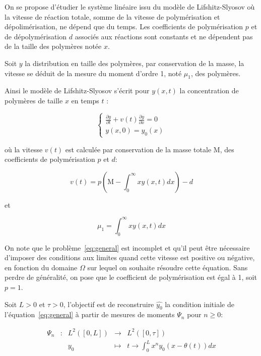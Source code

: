 \documentclass[a4paper]{article}
\newcommand{\mass}{\mathrm{M}}
\newcommand{\pol}{p}
\newcommand{\dep}{d}
\begin{document}
On se propose d'étudier le système linéaire issu du modèle de Lifshitz-Slyosov où la vitesse de réaction totale, 
somme de la vitesse de polymérisation et dépolimérisation, ne dépend que du temps. 
Les coefficients de polymérisation $\pol$ et de dépolymérisation $\dep$ associés aux réactions sont constants 
et ne dépendent pas de la taille des polymères notée $x$. 

Soit $y$ la distribution en taille des polymères, 
par conservation de la masse,
la vitesse se déduit de la mesure du moment d'ordre 1, noté $\mu_1$, des polymères.

Ainsi le modèle de Lifshitz-Slyosov s'écrit pour $y(x,t)$ la concentration de polymères de taille $x$ en temps $t$ :

\begin{equation}
\label{eq:general}
\begin{cases}
 \displaystyle \frac{\partial y}{\partial t}+ v(t) \frac{\partial y} {\partial x}  = 0  \\
 y(x,0) = y_{0} (x) 
\end{cases}
\end{equation}

où la vitesse $v(t)$ est calculée par conservation de la masse totale $\mass$, des coefficients de polymérisation $\pol$ et $\dep$:

\[
v(t) = \pol(\mass - \int_0 ^\infty x y(x,t) dx)-\dep
\]

et 

\[
\mu_1 = \int_0 ^\infty x y(x,t) dx
\]

 On note que le problème~\eqref{eq:general} est incomplet et qu'il peut être nécessaire d'imposer des conditions aux limites quand cette vitesse est positive ou négative, en fonction du domaine $\Omega$ sur lequel on souhaite résoudre cette équation.
Sans perdre de généralité, 
on pose que le coefficient de polymérisation est égal à 1, 
soit $\pol =1$.

Soit $L>0$ et $\tau>0$, l'objectif est de reconstruire $\hat{y_0}$ 
la condition initiale de l'équation~\eqref{eq:general} 
à partir de mesures de moments $\Psi_n$ pour $n \geq 0$:

 \begin{equation}
	\begin{array}{ccccc}
	\Psi_n & : & L^2([0,L]) & \to & L^2([0,\tau]) \\
	 & & y_0 & \mapsto & t \to \int_0^L x^n y_0(x-\theta(t)) dx\\
	\end{array}
\end{equation}
\end{document}

